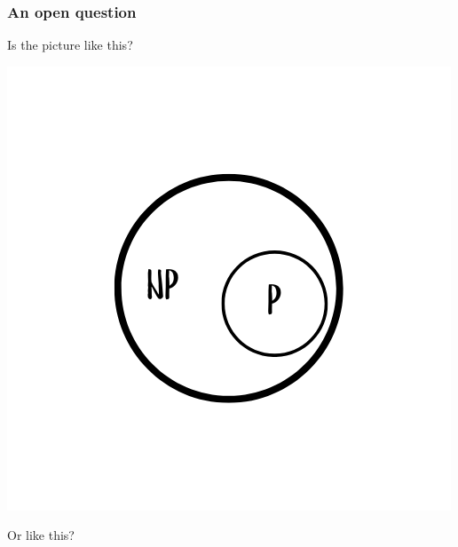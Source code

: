 \documentclass[10pt,aspectratio=43]{beamer}
\begin{document}
\begin{frame}
  \frametitle{An open question}

  \begin{minipage}{0.48\textwidth}
    \centering
    Is the picture like this?

    \vspace{0.3cm}

    \includegraphics[width=\linewidth]{figures/lec/np1.png} 
  \end{minipage}
  \hfill
  \begin{minipage}{0.48\textwidth}
    \centering
    Or like this?

    \vspace{0.3cm}


\end{minipage}
\end{frame}
\end{document}
